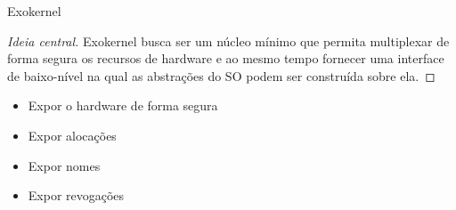 \documentclass[xcolor={usenames,svgnames,dvipsnames},brazil,english,12pt,aspectratio=149]{beamer}
\begin{document}
\begin{frame}{Exokernel}
  \begin{proof}[Ideia central]
Exokernel busca ser um núcleo mínimo que permita multiplexar de forma segura os
recursos de hardware e ao mesmo tempo fornecer uma interface de baixo-nível na
qual as abstrações do SO podem ser construída sobre ela.
  \end{proof}

  \begin{itemize}
    \item Expor o hardware de forma segura
    \item Expor alocações
    \item Expor nomes
    \item Expor revogações
  \end{itemize}

\end{frame}
\end{document}
